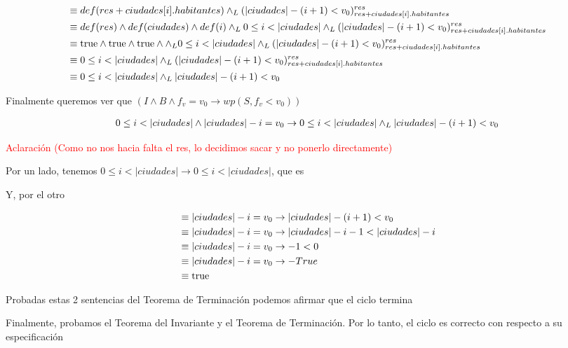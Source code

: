 \documentclass[10pt,a4paper]{article}
\begin{document}
\begin {enumerate}
    \begin{align*}
        &\equiv def (res + ciudades[i].habitantes) \land _L (|ciudades| - (i + 1) < v_{0})_{res + ciudades[i].habitantes}^{res} \\
        &\equiv def(res) \land def(ciudades) \land def(i) \land _L 0 \leq i < |ciudades| \land _L (|ciudades| - (i + 1) < v_{0})_{res + ciudades[i].habitantes}^{res}\\
        &\equiv \mathrm{true} \land \mathrm{true} \land \mathrm{true} \land \land _L 0 \leq i < |ciudades| \land _L (|ciudades| - (i + 1) < v_{0})_{res + ciudades[i].habitantes}^{res}\\
        &\equiv 0 \leq i < |ciudades| \land _L (|ciudades| - (i + 1) < v_{0})_{res + ciudades[i].habitantes}^{res}\\
        &\equiv 0 \leq i < |ciudades| \land _L |ciudades| - (i + 1) < v_{0}
    \end{align*}

    Finalmente queremos ver que $(I \land B \land f_{v} = v_{0} \to wp(S, f_{v} < v_{0}))$


    \begin{align*}
        0 \leq i < |ciudades| \land |ciudades| - i = v_{0} \to 0 \leq i < |ciudades| \land _L |ciudades| - (i + 1) < v_{0}
    \end{align*}

    \textcolor{red}{Aclaración (Como no nos hacia falta el res, lo decidimos sacar y no ponerlo directamente)}

    Por un lado, tenemos $0 \leq i < |ciudades| \to 0 \leq i < |ciudades|$, que es \True

    Y, por el otro 

    \begin{align*}
        &\equiv |ciudades| - i = v_{0} \to |ciudades| - (i + 1) < v_{0} \\
        &\equiv |ciudades| - i = v_{0} \to |ciudades| - i - 1 < |ciudades| - i \\
        &\equiv |ciudades| - i = v_{0} \to - 1 < 0 \\
        &\equiv |ciudades| - i = v_{0} \to - True \\
        &\equiv \mathrm{true}   
    \end{align*}

    Probadas estas 2 sentencias del Teorema de  Terminación podemos afirmar que el ciclo termina

    Finalmente, probamos el Teorema del Invariante y el Teorema de Terminación. Por lo tanto, el ciclo es correcto con respecto a su especificación


\end{enumerate}
\end{document}
